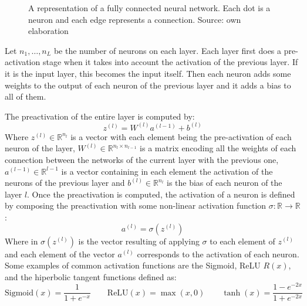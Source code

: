 \documentclass[11pt,a4paper,openright,oneside]{book}
\numberwithin{equation}{section}
\begin{document}
{\begin{figure}[H]

    \caption{A representation of a fully connected neural network. Each dot is a neuron and each edge represents a connection. Source: own elaboration}
    \label{fig:fcnn}
\end{figure}

Let $n_1, \dots, n_L$ be the number of neurons on each layer. Each layer first does a pre-activation stage when it takes into account
the activation of the previous layer. If it is the input layer, this becomes the input itself. Then
each neuron adds some weights to the output of each neuron of the previous layer and it adds a bias to all of them.

The preactivation of the entire layer is computed by:
$$z^{(l)} = W^{(l)} a^{(l - 1)} + b^{(l)}$$
Where $z^{(l)} \in \mathbb{R}^{n_l}$ is a vector with each element being
the pre-activation of each neuron of the layer, $W^{(l)} \in \mathbb{R}^{n_l \times n_{l-1}}$ is a matrix encoding all the weights of each connection
between the networks of the current layer with the previous one,
$a^{(l - 1)} \in \mathbb{R}^{l - 1}$ is a vector containing in each element the activation of the neurons of the previous layer
and $b^{(l)} \in \mathbb{R}^{n_l}$ is the bias of each neuron of the layer $l$. Once the preactivation is computed, the activation of a neuron is defined by composing the preactivation
with some non-linear activation function $\sigma : \mathbb{R} \rightarrow \mathbb{R}$:
$$a^{(l)} = \sigma(z^{(l)})$$
Where in $\sigma(z^{(l)})$ is the vector resulting of applying $\sigma$ to each element of $z^{(l)}$ and each element
of the vector $a^{(l)}$ corresponds to the activation of each neuron. Some examples of common activation functions are
the Sigmoid, ReLU $R(x)$, and the hiperbolic tangent functions defined as:
$$\text{Sigmoid}(x) = \frac{1}{1 + e^{-x}} \qquad \text{ReLU}(x) = \max(x, 0) \qquad \tanh(x) = \frac{1-e^{-2x}}{1+e^{-2x}}$$

}
\end{document}
